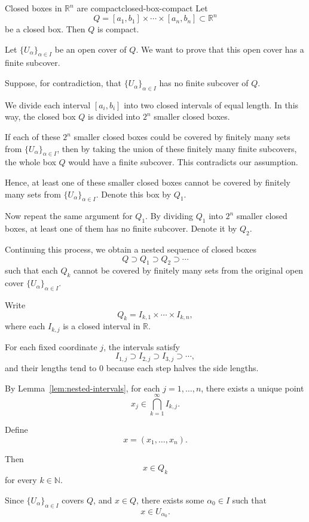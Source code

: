 \documentclass[UTF8,12pt,a4paper]{ctexart}
\makeatletter
\numberwithin{equation}{section}
\newcommand{\currentProofColor}{black}
\renewenvironment{proof}[1][Proof]{%
  \par
  \begingroup
  \edef\proofQEDColor{\currentProofColor}%
  \renewcommand{\qedsymbol}{\textcolor{\proofQEDColor}{$\blacksquare$}}%
  \pushQED{\qed}%
  \normalfont
  \topsep6\p@\@plus6\p@\relax
  \trivlist
  \item[\hskip\labelsep\bfseries\itshape #1\@addpunct{.}]\ignorespaces
}{%
  \popQED
  \endtrivlist
  \@endpefalse
  \endgroup
}
\makeatother
\begin{document}
\begin{lem}{Closed boxes in $\mathbb{R}^n$ are compact}{closed-box-compact}
Let
$$
Q = [a_1,b_1]\times \cdots \times [a_n,b_n] \subset \mathbb{R}^n
$$
be a closed box. Then $Q$ is compact.
\end{lem}

\begin{proof}
Let $\{U_\alpha\}_{\alpha\in I}$ be an open cover of $Q$. We want to prove that this open cover has a finite subcover.

Suppose, for contradiction, that $\{U_\alpha\}_{\alpha\in I}$ has no finite subcover of $Q$.

We divide each interval $[a_i,b_i]$ into two closed intervals of equal length. In this way, the closed box $Q$ is divided into $2^n$ smaller closed boxes.

If each of these $2^n$ smaller closed boxes could be covered by finitely many sets from $\{U_\alpha\}_{\alpha\in I}$, then by taking the union of these finitely many finite subcovers, the whole box $Q$ would have a finite subcover. This contradicts our assumption.

Hence, at least one of these smaller closed boxes cannot be covered by finitely many sets from $\{U_\alpha\}_{\alpha\in I}$. Denote this box by $Q_1$.

Now repeat the same argument for $Q_1$. By dividing $Q_1$ into $2^n$ smaller closed boxes, at least one of them has no finite subcover. Denote it by $Q_2$.

Continuing this process, we obtain a nested sequence of closed boxes
$$
Q \supset Q_1 \supset Q_2 \supset \cdots
$$
such that each $Q_k$ cannot be covered by finitely many sets from the original open cover $\{U_\alpha\}_{\alpha\in I}$.

Write
$$
Q_k = I_{k,1}\times \cdots \times I_{k,n},
$$
where each $I_{k,j}$ is a closed interval in $\mathbb{R}$.

For each fixed coordinate $j$, the intervals satisfy
$$
I_{1,j} \supset I_{2,j} \supset I_{3,j} \supset \cdots,
$$
and their lengths tend to $0$ because each step halves the side lengths.

By Lemma~\ref{lem:nested-intervals}, for each $j=1,\dots,n$, there exists a unique point
$$
x_j \in \bigcap_{k=1}^\infty I_{k,j}.
$$

Define
$$
x = (x_1,\dots,x_n).
$$

Then
$$
x\in Q_k
$$
for every $k\in\mathbb{N}$.

Since $\{U_\alpha\}_{\alpha\in I}$ covers $Q$, and $x\in Q$, there exists some $\alpha_0\in I$ such that
$$
x\in U_{\alpha_0}.
$$


\end{proof}
\end{document}
